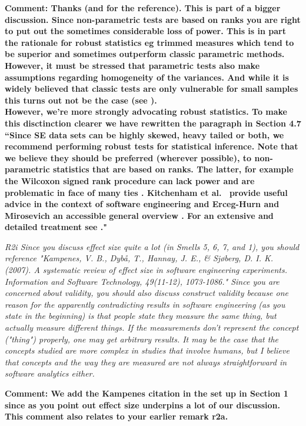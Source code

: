 {\bf Comment: Thanks (and for the reference). This is part of a bigger discussion.  Since non-parametric tests are based on ranks you are right to put out the sometimes considerable loss of power.  This is in part the rationale for robust statistics eg trimmed measures which tend to be superior and sometimes outperform classic parametric methods.  However, it must be stressed that parametric tests \textbf{also} make assumptions regarding homogeneity of the variances.  And while it is widely believed that classic tests are only vulnerable for small samples this turns out not be the case (see \cite{Erce08,Wilc98}). \\
However, we're more strongly advocating robust statistics.  To make this disctinction clearer we have rewritten the paragraph in Section 4.7\\
``Since SE data sets can be highly skewed, heavy tailed or both,   we recommend performing robust tests for statistical inference. Note that we believe they should be preferred (wherever possible), to non-parametric statistics that are based on ranks. The latter,   for example the Wilcoxon signed rank procedure can lack power and are problematic in face of many ties \cite{Blai85}.  Kitchenham et al.~\cite{Kitc17} provide useful advice in the context of software engineering and Erceg-Hurn and Mirosevich an accessible general overview \cite{Erce08}.  For an extensive and detailed treatment see \cite{Wilc12}."
}

{\em
R2i
Since you discuss effect size quite a lot (in Smells 5, 6, 7, and 1), you should reference "Kampenes, V. B., Dybå, T., Hannay, J. E., & Sjøberg, D. I. K. (2007). A systematic review of effect size in software engineering experiments. Information and Software Technology, 49(11-12), 1073-1086."
Since you are concerned about validity, you should also discuss construct validity because one reason for the apparently contradicting results in software engineering (as you state in the beginning) is that people state they measure the same thing, but actually measure different things. If the measurements don't represent the concept ("thing") properly, one may get arbitrary results. It may be the case that the concepts studied are more complex in studies that involve humans, but I believe that concepts and the way they are measured are not always straightforward in software analytics either.
}

{\bf Comment: We add the Kampenes citation in the set up in Section 1 since as you point out effect size underpins a lot of our discussion.  This comment also relates to your earlier remark r2a.}

